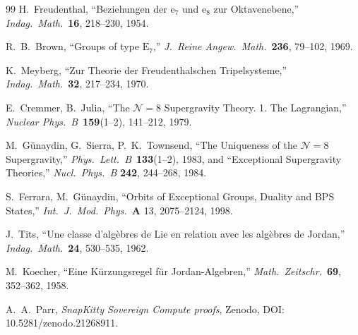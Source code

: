 \documentclass[11pt]{article}
\theoremstyle{definition}
\begin{document}
\begin{thebibliography}{99}
H.~Freudenthal, ``Beziehungen der $\mathrm{e}_7$ und $\mathrm{e}_8$ zur
Oktavenebene,'' \emph{Indag.\ Math.}\ \textbf{16}, 218--230, 1954.

R.~B.~Brown, ``Groups of type $\mathrm{E}_7$,''
\emph{J.\ Reine Angew.\ Math.}\ \textbf{236}, 79--102, 1969.

K.~Meyberg, ``Zur Theorie der Freudenthalschen Tripelsysteme,''
\emph{Indag.\ Math.}\ \textbf{32}, 217--234, 1970.

E.~Cremmer, B.~Julia, ``The $\mathcal{N}=8$ Supergravity Theory. 1. The
Lagrangian,'' \emph{Nuclear Phys.\ B}\ \textbf{159}(1--2), 141--212, 1979.

M.~Günaydin, G.~Sierra, P.~K.~Townsend, ``The Uniqueness of the
$\mathcal{N}=8$ Supergravity,'' \emph{Phys.\ Lett.\ B}\ \textbf{133}(1--2),
1983, and ``Exceptional Supergravity Theories,'' \emph{Nucl.\ Phys.\ B}
\textbf{242}, 244--268, 1984.

S.~Ferrara, M.~Günaydin, ``Orbits of Exceptional Groups, Duality and BPS
States,'' \emph{Int.\ J.\ Mod.\ Phys.}\ \textbf{A} 13, 2075--2124, 1998.

J.~Tits, ``Une classe d'algèbres de Lie en relation avec les algèbres de
Jordan,'' \emph{Indag.\ Math.}\ \textbf{24}, 530--535, 1962.

M.~Koecher, ``Eine Kürzungsregel für Jordan-Algebren,''
\emph{Math.\ Zeitschr.}\ \textbf{69}, 352--362, 1958.

A.~A.~Parr, \emph{SnapKitty Sovereign Compute proofs},
Zenodo, DOI: 10.5281/zenodo.21268911.

\end{thebibliography}
\end{document}
